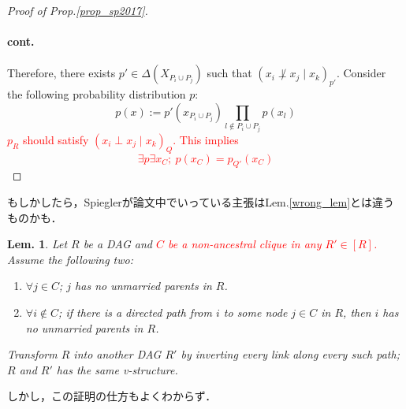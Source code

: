 \documentclass[11pt,a4paper,dvipdfmx]{article}
\theoremstyle{plain}
\newtheorem{lem}{Lem.}[section]
\newcommand{\ocomment}[1]{{\textcolor{red}{#1}}}
\begin{document}
\begin{proof}[Proof of Prop.\ref{prop_sp2017}]
	\paragraph{cont.}
	Therefore, there exists $p' \in \Delta(X_{P_i \cup P_j})$ such that 
	$(x_i \not\perp x_j \mid x_k)_{p'}$.
	Consider the following probability distribution $p$:
	\[
	p(x) := p'(x_{P_i \cup P_j}) \prod_{l \notin P_i \cup P_j} p(x_l)
	\]
	\ocomment{
	$p_R$ should satisfy $(x_i \perp x_j \mid x_k)_{Q}$. This implies
	\[
	\exists p \exists x_C; \ p(x_C) = p_{Q'}(x_C)
	\]
	}
\end{proof}

もしかしたら，Spieglerが論文中でいっている主張はLem.\ref{wrong_lem}とは違うものかも．
\begin{screen}
	\begin{lem} \label{spiegler_lem}
	Let $R$ be a DAG and \ocomment{$C$ be a non-ancestral clique in any $R' \in [R]$.} Assume the following two:
		\begin{enumerate}
			\item $\forall j \in C$; $j$ has no unmarried parents in $R$.
			\item $\forall i \notin C$; if there is a directed path from $i$ to some node $j \in C$ in $R$, then $i$ has no unmarried parents in $R$.
		\end{enumerate}
		Transform $R$ into another DAG $R'$ by inverting every link along every such path; $R$ and $R'$ has the same v-structure.
	\end{lem}
\end{screen}
しかし，この証明の仕方もよくわからず．
\end{document}
